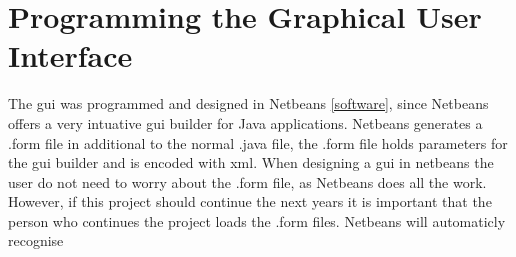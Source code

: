 \section{Programming the Graphical User Interface}
The \acrshort{gui} was programmed and designed in Netbeans \ref{software}, since Netbeans offers a very intuative \acrshort{gui} builder for Java applications. Netbeans generates a .form file in additional to the normal .java file, the .form file holds parameters for the gui builder and is encoded with xml. When designing a gui in netbeans the user do not need to worry about the .form file, as Netbeans does all the work. However, if this project should continue the next years it is important that the person who continues the project loads the .form files. Netbeans will automaticly recognise 